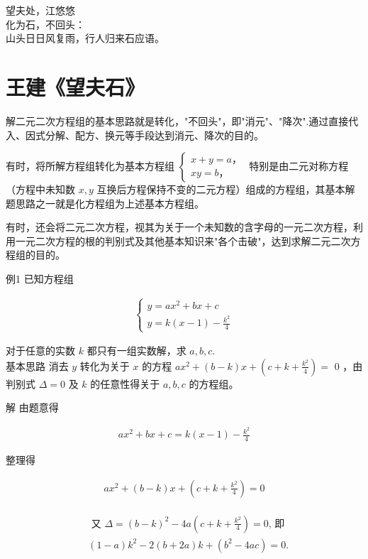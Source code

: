 \documentclass[10pt]{article}
\begin{document}
望夫处，江悠悠\\
化为石，不回头：\\
山头日日风复雨，行人归来石应语。

\section*{王建《望夫石》}
解二元二次方程组的基本思路就是转化，"不回头"，即"消元"、"降次".通过直接代入、因式分解、配方、换元等手段达到消元、降次的目的。

有时，将所解方程组转化为基本方程组 $\left\{\begin{array}{l}x+y=a ， \\ x y=b ，\end{array}\right.$ 特别是由二元对称方程（方程中未知数 $x, y$ 互换后方程保持不变的二元方程）组成的方程组，其基本解题思路之一就是化方程组为上述基本方程组。

有时，还会将二元二次方程，视其为关于一个未知数的含字母的一元二次方程，利用一元二次方程的根的判别式及其他基本知识来"各个击破"，达到求解二元二次方程组的目的。

例1 已知方程组

\begin{align*}
\left\{\begin{array}{l}
y=a x^{2}+b x+c \\
y=k(x-1)-\frac{k^{2}}{4}
\end{array}\right.
\end{align*}

对于任意的实数 $k$ 都只有一组实数解，求 $a, b, c$.\\
基本思路 消去 $y$ 转化为关于 $x$ 的方程 $a x^{2}+(b-k) x+\left(c+k+\frac{k^{2}}{4}\right)=$ 0 ，由判别式 $\Delta=0$ 及 $k$ 的任意性得关于 $a, b, c$ 的方程组。

解 由题意得

\begin{align*}
a x^{2}+b x+c=k(x-1)-\frac{k^{2}}{4}
\end{align*}

整理得

\begin{align*}
a x^{2}+(b-k) x+\left(c+k+\frac{k^{2}}{4}\right)=0
\end{align*}

\begin{align*}
\begin{aligned}
& \text { 又 } \Delta=(b-k)^{2}-4 a\left(c+k+\frac{k^{2}}{4}\right)=0 \text {, 即 } \\
&(1-a) k^{2}-2(b+2 a) k+\left(b^{2}-4 a c\right)=0 .
\end{aligned}
\end{align*}
\end{document}
